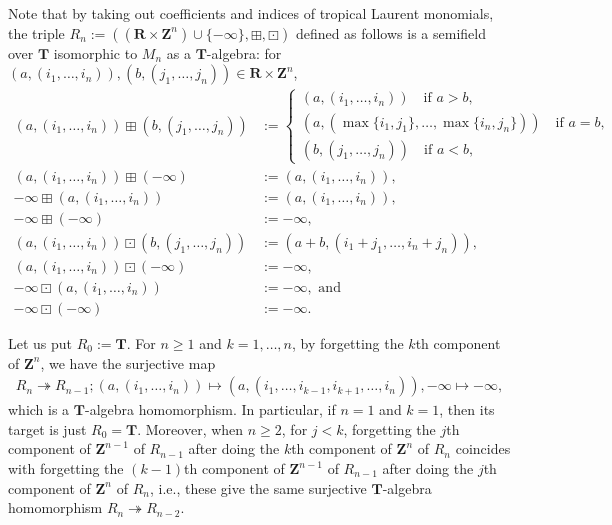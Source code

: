 \documentclass[a4paper,12pt]{amsart}
\begin{document}
Note that by taking out coefficients and indices of tropical Laurent monomials, the triple $R_n := ((\boldsymbol{R} \times \boldsymbol{Z}^n) \cup \{ -\infty \}, \boxplus, \boxdot)$ defined as follows is a semifield over $\boldsymbol{T}$ isomorphic to $M_n$ as a $\boldsymbol{T}$-algebra:
for $(a, (i_1, \ldots, i_n)), (b, (j_1, \ldots, j_n)) \in \boldsymbol{R} \times \boldsymbol{Z}^n$,
\begin{align*}
(a, (i_1, \ldots, i_n)) \boxplus (b, (j_1, \ldots, j_n)) &:= \begin{cases}
(a, (i_1, \ldots, i_n)) \quad \text{if }a > b,\\
(a, (\operatorname{max}\{ i_1, j_1 \}, \ldots, \operatorname{max}\{ i_n, j_n \})) \quad \text{if }a = b,\\
(b, (j_1, \ldots, j_n)) \quad \text{if }a < b,
\end{cases}\\
(a, (i_1, \ldots, i_n)) \boxplus (-\infty) &:= (a, (i_1, \ldots, i_n)),\\
-\infty \boxplus (a, (i_1, \ldots, i_n)) &:= (a, (i_1, \ldots, i_n)),\\
-\infty \boxplus (-\infty) &:= -\infty,\\
(a, (i_1, \ldots, i_n)) \boxdot (b, (j_1, \ldots, j_n)) &:= (a + b, (i_1 + j_1, \ldots, i_n + j_n)),\\
(a, (i_1, \ldots, i_n)) \boxdot (-\infty) &:= -\infty,\\
-\infty \boxdot (a, (i_1, \ldots, i_n)) &:= -\infty, \text{ and}\\
-\infty \boxdot (-\infty) &:= -\infty.
\end{align*}

Let us put $R_0 := \boldsymbol{T}$.
For $n \ge 1$ and $k = 1, \ldots, n$, by forgetting the $k$th component of $\boldsymbol{Z}^n$, we have the surjective map
\begin{align*}
R_n \twoheadrightarrow R_{n - 1};
(a, (i_1, \ldots, i_n)) \mapsto (a, (i_1, \ldots, i_{k - 1}, i_{k + 1}, \ldots, i_n)), -\infty \mapsto -\infty,
\end{align*}
which is a $\boldsymbol{T}$-algebra homomorphism.
In particular, if $n = 1$ and $k = 1$, then its target is just $R_0 = \boldsymbol{T}$.
Moreover, when $n \ge 2$, for $j < k$, forgetting the $j$th component of $\boldsymbol{Z}^{n - 1}$ of $R_{n - 1}$ after doing the $k$th component of $\boldsymbol{Z}^n$ of $R_n$ coincides with forgetting the $(k - 1)$th component of $\boldsymbol{Z}^{n - 1}$ of $R_{n - 1}$ after doing the $j$th component of $\boldsymbol{Z}^n$ of $R_n$, i.e., these give the same surjective $\boldsymbol{T}$-algebra homomorphism $R_n \twoheadrightarrow R_{n - 2}$.
\end{document}
